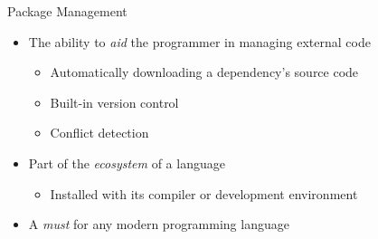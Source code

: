 \begin{secframe}{Package Management}

    \begin{itemize}

        \item The ability to \textit{aid} the programmer in managing external code\\
            \begin{itemize}
                \item Automatically downloading a dependency's source code
                \item Built-in version control
                \item Conflict detection
            \end{itemize}

        \item Part of the \textit{ecosystem} of a language\\
            \begin{itemize}
                \item Installed with its compiler or development environment
            \end{itemize}

        \item A \textit{must} for any modern programming language\\

    \end{itemize}

    \vfill

\end{secframe}

